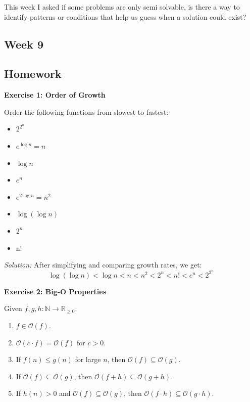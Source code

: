 \documentclass{article}
\theoremstyle{theorem}
\theoremstyle{definition}
\theoremstyle{remark}
\begin{document}
This week I asked if some problems are only semi solvable, is there a way to identify patterns or conditions that help us guess when a solution could exist?

\subsection{Week 9}
\smallskip


\subsection*{Homework}
\textbf{Exercise 1: Order of Growth}

Order the following functions from slowest to fastest:

\begin{itemize}
    \item[(a)] $2^{2^n}$
    \item[(b)] $e^{\log n} = n$
    \item[(c)] $\log n$
    \item[(d)] $e^n$
    \item[(e)] $e^{2\log n} = n^2$
    \item[(f)] $\log(\log n)$
    \item[(g)] $2^n$
    \item[(h)] n!
\end{itemize}

\textit{Solution:} After simplifying and comparing growth rates, we get:
\[
\log(\log n) < \log n < n < n^2 < 2^n < n! < e^n < 2^{2^n}
\]

\vspace{1em}
\textbf{Exercise 2: Big-O Properties}

Given $f, g, h : \mathbb{N} \to \mathbb{R}_{\geq 0}$:

\begin{enumerate}
    \item $f \in \mathcal{O}(f)$.
    \item $\mathcal{O}(c \cdot f) = \mathcal{O}(f)$ for $c > 0$.
    \item If $f(n) \leq g(n)$ for large $n$, then $\mathcal{O}(f) \subseteq \mathcal{O}(g)$.
    \item If $\mathcal{O}(f) \subseteq \mathcal{O}(g)$, then $\mathcal{O}(f+h) \subseteq \mathcal{O}(g+h)$.
    \item If $h(n) > 0$ and $\mathcal{O}(f) \subseteq \mathcal{O}(g)$, then $\mathcal{O}(f \cdot h) \subseteq \mathcal{O}(g \cdot h)$.
\end{enumerate}
\end{document}
